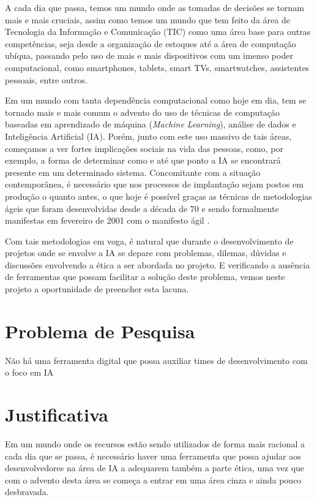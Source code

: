 \label{introducao}

A cada dia que passa, temos um mundo onde as tomadas de decisões se tornam mais e mais cruciais, assim como temos um mundo que tem feito da área de Tecnologia da Informação e Comunicação (TIC) como uma área base para outras competências, seja desde a organização de estoques até a área de computação ubíqua, passando pelo uso de mais e mais dispositivos com um imenso poder computacional, como smartphones, tablets, smart TVs, smartwatches, assistentes pessoais, entre outros. 

Em um mundo com tanta dependência computacional como hoje em dia, tem se tornado mais e mais comum o advento do uso de técnicas de computação baseadas em aprendizado de máquina (\textit{Machine Learning}), análise de dados e Inteligência Artificial (IA). Porém, junto com este uso massivo de tais áreas, começamos a ver fortes implicações sociais na vida das pessoas, como, por exemplo, a forma de determinar como e até que ponto a \acrshort{IA} se encontrará presente em um determinado sistema. Concomitante com a situação contemporânea, é necessário que nos processos de implantação sejam postos em produção o quanto antes, o que hoje é possível graças as técnicas de metodologias ágeis que foram desenvolvidas desde a década de 70 e sendo formalmente manifestas em fevereiro de 2001 com o manifesto ágil \cite{agilemanifesto}. 

Com tais metodologias em voga, é natural que durante o desenvolvimento de projetos onde se envolve a \acrshort{IA} se depare com problemas, dilemas, dúvidas e discussões envolvendo a ética a ser abordada no projeto. E verificando a ausência de ferramentas que possam facilitar a solução deste problema, vemos neste projeto a oportunidade de preencher esta lacuna.



\section{Problema de Pesquisa}
Não há uma ferramenta digital que possa auxiliar times de desenvolvimento com o foco em \acrshort{IA}

\section{Justificativa}
Em um mundo onde os recursos estão sendo utilizados de forma mais racional a cada dia que se passa, é necessário haver uma ferramenta que possa ajudar aos desenvolvedores na área de \acrshort{IA} a adequarem também a parte ética, uma vez que com o advento desta área se começa a entrar em uma área cinza e ainda pouco desbravada.

